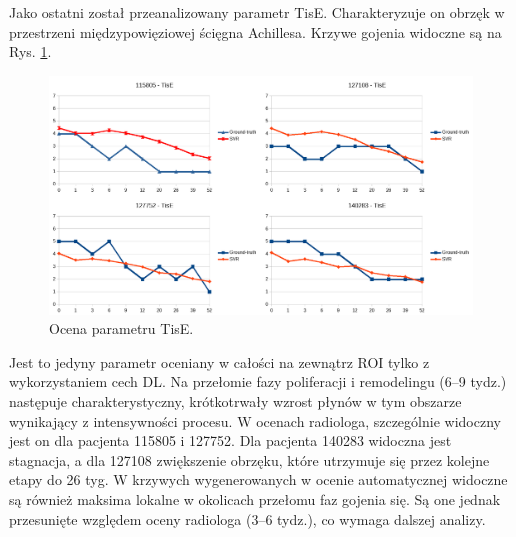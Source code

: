 Jako ostatni został przeanalizowany parametr TisE. Charakteryzuje on obrzęk w przestrzeni międzypowięziowej ścięgna Achillesa. Krzywe gojenia widoczne są na Rys. \ref{fig:TisE}.
\begin{figure}[h!]
	\centering
	\includegraphics[width=1\textwidth]{figures/TisE.png}
	\caption{Ocena parametru TisE.}\label{fig:TisE}
\end{figure}
Jest to jedyny parametr oceniany w całości na zewnątrz ROI tylko z wykorzystaniem cech DL. Na przełomie fazy poliferacji i remodelingu (6--9 tydz.) następuje charakterystyczny, krótkotrwały wzrost płynów w tym obszarze wynikający z intensywności procesu. W ocenach radiologa, szczególnie widoczny jest on dla pacjenta 115805 i 127752. Dla pacjenta 140283 widoczna jest stagnacja, a dla 127108 zwiększenie obrzęku, które utrzymuje się przez kolejne etapy do 26 tyg. W krzywych wygenerowanych w ocenie automatycznej widoczne są również maksima lokalne w okolicach przełomu faz gojenia się. Są one jednak przesunięte względem oceny radiologa (3--6 tydz.), co wymaga dalszej analizy.


